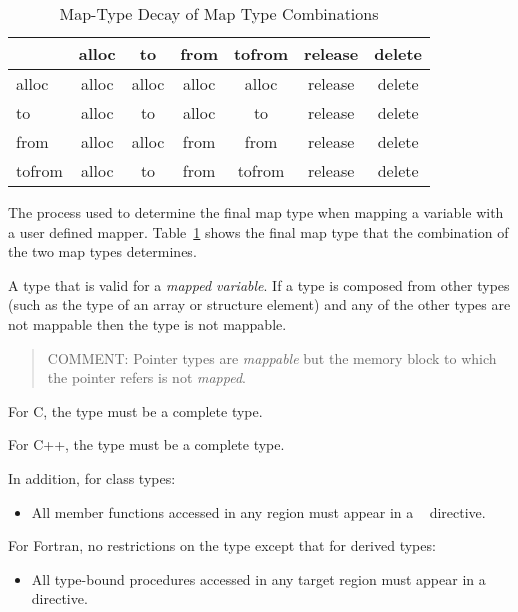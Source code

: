 \begin{table}[b]
\centering
\caption{Map-Type Decay of Map Type Combinations\label{tab:map-type_decay}}
\begin{tabular}{l|c|c|c|c|c|c}
  & alloc & to    & from  & tofrom & release & delete \\
  \hline
alloc  & alloc & alloc & alloc & alloc  & release & delete \\
to     & alloc & to    & alloc & to     & release & delete \\
from   & alloc & alloc & from  & from   & release & delete \\
tofrom & alloc & to    & from  & tofrom & release & delete \\
\end{tabular}
\end{table}

\glossarydefstart
The process used to determine the final map type when mapping a variable
with a user defined mapper. Table~\ref{tab:map-type_decay} shows the final 
map type that the combination of the two map types determines.
\glossarydefend

\glossarydefstart
A type that is valid for a \emph{mapped variable}. If a type is composed 
from other types (such as the type of an array or structure element) and 
any of the other types are not mappable then the type is not mappable.

\begin{quote}
COMMENT: Pointer types are \emph{mappable} but the memory block to which 
the pointer refers is not \emph{mapped}.
\end{quote}

For C, the type must be a complete type.

For C++, the type must be a complete type.

In addition, for class types:
\begin{itemize}
\item All member functions accessed in any  region must appear in a
~ directive.
\end{itemize}

For Fortran, no restrictions on the type except that for derived types:

\begin{itemize}
\item All type-bound procedures accessed in any target region must appear in a 
~ directive.
\end{itemize}
\glossarydefend

